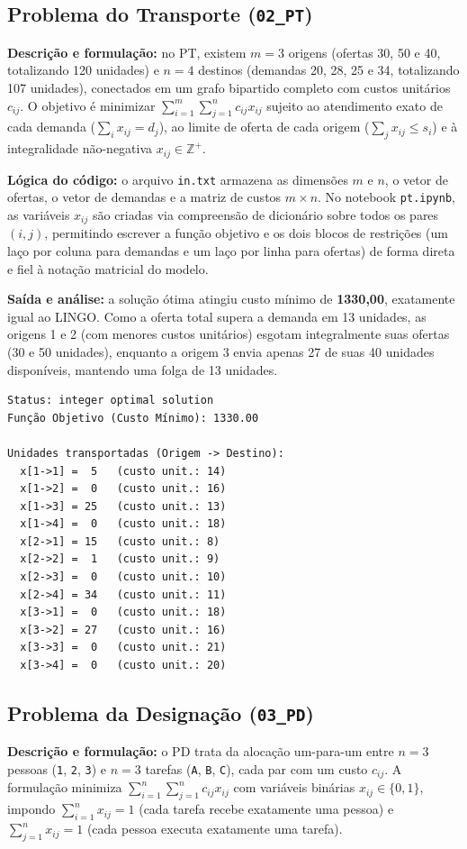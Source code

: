 \documentclass[11pt,a4paper]{article}
\begin{document}
\subsection{Problema do Transporte (\texttt{02\_PT})}
\textbf{Descrição e formulação:} no PT, existem $m=3$ origens (ofertas 30, 50 e 40, totalizando 120 unidades) e $n=4$ destinos (demandas 20, 28, 25 e 34, totalizando 107 unidades), conectados em um grafo bipartido completo com custos unitários $c_{ij}$. O objetivo é minimizar $\sum_{i=1}^{m}\sum_{j=1}^{n} c_{ij} x_{ij}$ sujeito ao atendimento exato de cada demanda ($\sum_{i} x_{ij} = d_j$), ao limite de oferta de cada origem ($\sum_{j} x_{ij} \le s_i$) e à integralidade não-negativa $x_{ij} \in \mathbb{Z}^+$.

\textbf{Lógica do código:} o arquivo \texttt{in.txt} armazena as dimensões $m$ e $n$, o vetor de ofertas, o vetor de demandas e a matriz de custos $m \times n$. No notebook \texttt{pt.ipynb}, as variáveis $x_{ij}$ são criadas via compreensão de dicionário sobre todos os pares $(i,j)$, permitindo escrever a função objetivo e os dois blocos de restrições (um laço por coluna para demandas e um laço por linha para ofertas) de forma direta e fiel à notação matricial do modelo.

\textbf{Saída e análise:} a solução ótima atingiu custo mínimo de \textbf{1330,00}, exatamente igual ao LINGO. Como a oferta total supera a demanda em 13 unidades, as origens 1 e 2 (com menores custos unitários) esgotam integralmente suas ofertas (30 e 50 unidades), enquanto a origem 3 envia apenas 27 de suas 40 unidades disponíveis, mantendo uma folga de 13 unidades.

\begin{minipage}{\linewidth}
\begin{lstlisting}
Status: integer optimal solution
Função Objetivo (Custo Mínimo): 1330.00

Unidades transportadas (Origem -> Destino):
  x[1->1] =  5   (custo unit.: 14)
  x[1->2] =  0   (custo unit.: 16)
  x[1->3] = 25   (custo unit.: 13)
  x[1->4] =  0   (custo unit.: 18)
  x[2->1] = 15   (custo unit.: 8)
  x[2->2] =  1   (custo unit.: 9)
  x[2->3] =  0   (custo unit.: 10)
  x[2->4] = 34   (custo unit.: 11)
  x[3->1] =  0   (custo unit.: 18)
  x[3->2] = 27   (custo unit.: 16)
  x[3->3] =  0   (custo unit.: 21)
  x[3->4] =  0   (custo unit.: 20)
\end{lstlisting}
\end{minipage}

\subsection{Problema da Designação (\texttt{03\_PD})}
\textbf{Descrição e formulação:} o PD trata da alocação um-para-um entre $n=3$ pessoas (\texttt{1}, \texttt{2}, \texttt{3}) e $n=3$ tarefas (\texttt{A}, \texttt{B}, \texttt{C}), cada par com um custo $c_{ij}$. A formulação minimiza $\sum_{i=1}^{n}\sum_{j=1}^{n} c_{ij} x_{ij}$ com variáveis binárias $x_{ij} \in \{0,1\}$, impondo $\sum_{i=1}^{n} x_{ij} = 1$ (cada tarefa recebe exatamente uma pessoa) e $\sum_{j=1}^{n} x_{ij} = 1$ (cada pessoa executa exatamente uma tarefa).
\end{document}
